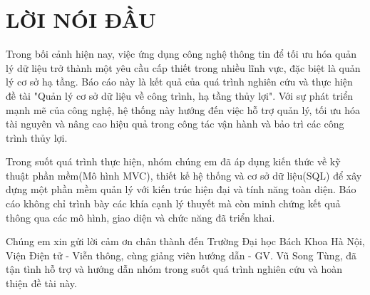 \section*{LỜI NÓI ĐẦU}
\thispagestyle{empty}
Trong bối cảnh hiện nay, việc ứng dụng công nghệ thông tin 
để tối ưu hóa quản lý dữ liệu trở thành một yêu cầu cấp thiết 
trong nhiều lĩnh vực, đặc biệt là quản lý cơ sở hạ tầng. 
Báo cáo này là kết quả của quá trình nghiên cứu và thực hiện đề tài 
"Quản lý cơ sở dữ liệu về công trình, hạ tầng thủy lợi". 
Với sự phát triển mạnh mẽ của công nghệ, 
hệ thống này hướng đến việc hỗ trợ quản lý, 
tối ưu hóa tài nguyên và nâng cao hiệu quả trong 
công tác vận hành và bảo trì các công trình thủy lợi.

Trong suốt quá trình thực hiện, 
nhóm chúng em đã áp dụng kiến thức về kỹ thuật phần mềm(Mô hình MVC), 
thiết kế hệ thống và cơ sở dữ liệu(SQL) để xây dựng một phần mềm 
quản lý với kiến trúc hiện đại và tính năng toàn diện. 
Báo cáo không chỉ trình bày các khía cạnh lý thuyết mà còn 
minh chứng kết quả thông qua các mô hình, 
giao diện và chức năng đã triển khai.

Chúng em xin gửi lời cảm ơn chân thành đến 
Trường Đại học Bách Khoa Hà Nội, Viện Điện tử - Viễn thông, 
cùng giảng viên hướng dẫn - GV. Vũ Song Tùng, 
đã tận tình hỗ trợ và hướng dẫn nhóm trong suốt 
quá trình nghiên cứu và hoàn thiện đề tài này. 
\cleardoublepage